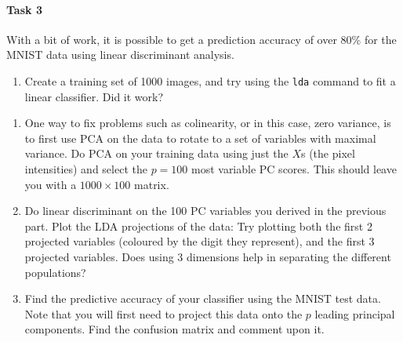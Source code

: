 \documentclass[
]{book}
\newenvironment{Shaded}{\begin{snugshade}}{\end{snugshade}}
\newcommand{\DecValTok}[1]{\textcolor[rgb]{0.00,0.00,0.81}{#1}}
\newcommand{\FunctionTok}[1]{\textcolor[rgb]{0.13,0.29,0.53}{\textbf{#1}}}
\newcommand{\NormalTok}[1]{#1}
\newcommand{\OtherTok}[1]{\textcolor[rgb]{0.56,0.35,0.01}{#1}}
\newcommand{\SpecialCharTok}[1]{\textcolor[rgb]{0.81,0.36,0.00}{\textbf{#1}}}
\newcommand{\StringTok}[1]{\textcolor[rgb]{0.31,0.60,0.02}{#1}}
\providecommand{\tightlist}{%
  \setlength{\itemsep}{0pt}\setlength{\parskip}{0pt}}
\theoremstyle{definition}
\theoremstyle{definition}
\theoremstyle{definition}
\theoremstyle{definition}
\theoremstyle{remark}
\begin{document}
\hypertarget{task-3-3}{%
\paragraph*{Task 3}\label{task-3-3}}

With a bit of work, it is possible to get a prediction accuracy of over 80\% for the MNIST data using linear discriminant analysis.

\begin{enumerate}
\def\labelenumi{\roman{enumi}.}
\tightlist
\item
  Create a training set of 1000 images, and try using the \texttt{lda} command to fit a linear classifier. Did it work?
\end{enumerate}

\begin{Shaded}
\end{Shaded}

\begin{enumerate}
\def\labelenumi{\roman{enumi}.}
\setcounter{enumi}{1}
\item
  One way to fix problems such as colinearity, or in this case, zero variance, is to first use PCA on the data to rotate to a set of variables with maximal variance. Do PCA on your training data using just the \(X\)s (the pixel intensities) and select the \(p=100\) most variable PC scores. This should leave you with a \(1000 \times 100\) matrix.
\item
  Do linear discriminant on the 100 PC variables you derived in the previous part. Plot the LDA projections of the data: Try plotting both the first 2 projected variables (coloured by the digit they represent), and the first 3 projected variables.
  Does using 3 dimensions help in separating the different populations?
\item
  Find the predictive accuracy of your classifier using the MNIST test data. Note that you will first need to project this data onto the \(p\) leading principal components. Find the confusion matrix and comment upon it.
\end{enumerate}
\end{document}
